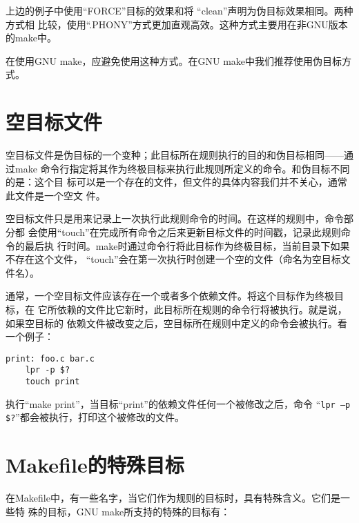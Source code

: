 上边的例子中使用“FORCE”目标的效果和将 “clean”声明为伪目标效果相同。两种方式相
比较，使用“.PHONY”方式更加直观高效。这种方式主要用在非GNU版本的make中。

在使用GNU make，应避免使用这种方式。在GNU make中我们推荐使用伪目标方式。

\section{空目标文件}
空目标文件是伪目标的一个变种；此目标所在规则执行的目的和伪目标相同——通过make
命令行指定将其作为终极目标来执行此规则所定义的命令。和伪目标不同的是：这个目
标可以是一个存在的文件，但文件的具体内容我们并不关心，通常此文件是一个空文
件。

空目标文件只是用来记录上一次执行此规则命令的时间。在这样的规则中，命令部分都
会使用“touch”在完成所有命令之后来更新目标文件的时间戳，记录此规则命令的最后执
行时间。make时通过命令行将此目标作为终极目标，当前目录下如果不存在这个文件，
“touch”会在第一次执行时创建一个空的文件（命名为空目标文件名）。

通常，一个空目标文件应该存在一个或者多个依赖文件。将这个目标作为终极目标，在
它所依赖的文件比它新时，此目标所在规则的命令行将被执行。就是说，如果空目标的
依赖文件被改变之后，空目标所在规则中定义的命令会被执行。看一个例子：

\begin{Verbatim}[]
print: foo.c bar.c
    lpr -p $?
    touch print
\end{Verbatim}

执行“make print”，当目标“print”的依赖文件任何一个被修改之后，命令
“\verb"lpr –p $?"”都会被执行，打印这个被修改的文件。

\section{Makefile的特殊目标}
在Makefile中，有一些名字，当它们作为规则的目标时，具有特殊含义。它们是一些特
殊的目标，GNU make所支持的特殊的目标有：

